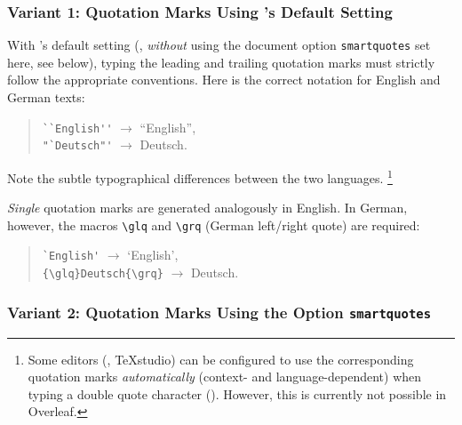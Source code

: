 \subsubsection{Variant 1: Quotation Marks Using \latex's Default Setting}

With \latex's default setting (\ie, \emph{without} using the document option
\texttt{smartquotes} set here, see below), typing the leading and trailing
quotation marks must strictly follow the appropriate conventions. Here is the
correct \latex notation for English and German texts:
%
\begin{quote}
    \verb!``English''! $\rightarrow$ ``English'',\\
    \verb!"`Deutsch"'! $\rightarrow$ {\glqq}Deutsch{\grqq}.
\end{quote}
%
Note the subtle typographical differences between the two languages.%
\footnote{Some editors (\eg, \textsf{TeXstudio}) can be configured to use the
corresponding quotation marks \emph{automatically} (context- and
language-dependent) when typing a double quote character
(\texttt{\textquotedbl}). However, this is currently not possible in
\textsf{Overleaf}.}

\emph{Single} quotation marks are generated analogously in English. In German,
however, the macros \verb!\glq! and \verb!\grq! (German left/right quote) are
required:
%
\begin{quote}
    \verb!`English'! $\rightarrow$ `English',\\
    \verb!{\glq}Deutsch{\grq}! $\rightarrow$ {\glq}Deutsch{\grq}.
\end{quote}

\subsubsection{Variant 2: Quotation Marks Using the Option \texttt{smartquotes}}

